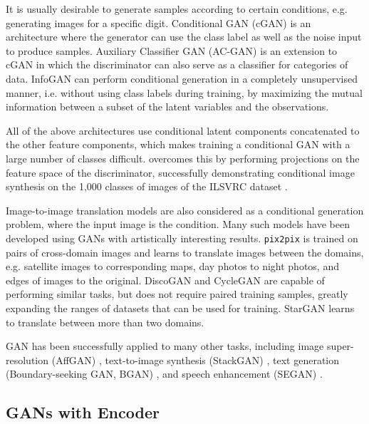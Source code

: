 It is usually desirable to generate samples according to certain conditions, e.g. generating images for a specific digit.
Conditional GAN (cGAN) \cite{mirza2014conditional} is an architecture where the generator can use the class label as well as the noise input to produce samples.
Auxiliary Classifier GAN (AC-GAN) \cite{odena2016acgan} is an extension to cGAN in which the discriminator can also serve as a classifier for categories of data.
InfoGAN \cite{chen2016infogan} can perform conditional generation in a completely unsupervised manner, i.e. without using class labels during training, by maximizing the mutual information between a subset of the latent variables and the observations.

All of the above architectures use conditional latent components concatenated to the other feature components, which makes training a conditional GAN with a large number of classes difficult.
\cite{miyato2018cgan} overcomes this by performing projections on the feature space of the discriminator, successfully demonstrating conditional image synthesis on the 1,000 classes of images of the ILSVRC dataset \cite{russakovsky2015imagenet}.

Image-to-image translation models are also considered as a conditional generation problem, where the input image is the condition.
Many such models have been developed using GANs with artistically interesting results.
\texttt{pix2pix} \cite{isola2017pix2pix} is trained on pairs of cross-domain images and learns to translate images between the domains, e.g. satellite images to corresponding maps, day photos to night photos, and edges of images to the original.
DiscoGAN and CycleGAN \cite{kim2017discogan, zhu2017cyclegan} are capable of performing similar tasks, but does not require paired training samples, greatly expanding the ranges of datasets that can be used for training.
StarGAN \cite{choi2017stargan} learns to translate between more than two domains.

GAN has been successfully applied to many other tasks, including image super-resolution (AffGAN) \cite{sonderby2016amortised}, text-to-image synthesis (StackGAN) \cite{zhang2017stackgan,zhang2017stackgan2}, text generation (Boundary-seeking GAN, BGAN) \cite{hjelm2018bsgan}, and speech enhancement (SEGAN) \cite{pascual2017segan}.

\iffalse
\subsection{GANs with Encoder}\label{subsec:gan-encoder}

